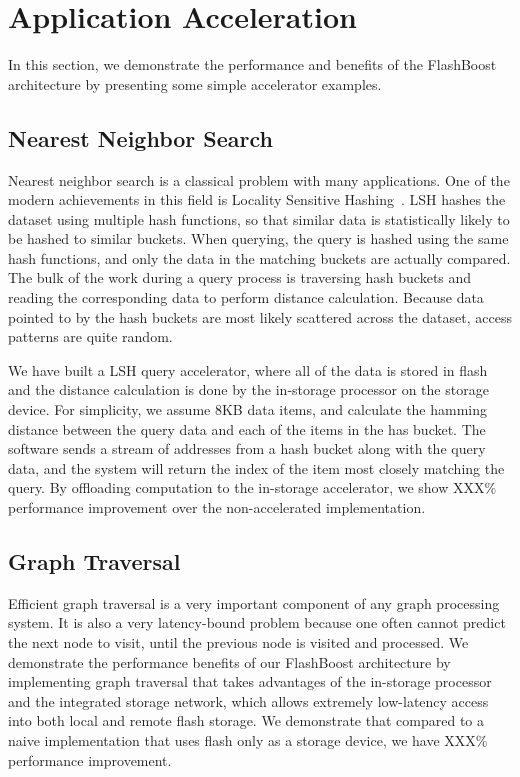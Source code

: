 \section{Application Acceleration}
\label{sec:acceleration}

In this section, we demonstrate the performance and benefits of the FlashBoost
architecture by presenting some simple accelerator examples. 

\subsection{Nearest Neighbor Search}

Nearest neighbor search is a classical problem with many applications. One of
the modern achievements in this field is Locality Sensitive Hashing~\cite{lsh}.
LSH hashes the dataset using multiple hash functions, so that
similar data is statistically likely to be hashed to similar buckets. When
querying, the query is hashed using the same hash functions, and only the data
in the matching buckets are actually compared. The bulk of the work during a
query process is traversing hash buckets and reading the corresponding data to
perform distance calculation. Because data pointed to by the hash buckets are
most likely scattered across the dataset, access patterns are quite random.

We have built a LSH query accelerator, where all of the data is stored in flash
and the distance calculation is done by the in-storage processor on the storage
device. For simplicity, we assume 8KB data items, and calculate the hamming
distance between the query data and each of the items in the has bucket. The
software sends a stream of addresses from a hash bucket along with the query
data, and the system will return the index of the item most closely matching the
query. By offloading computation to the in-storage accelerator, we
show XXX\% performance improvement over the non-accelerated implementation.



\subsection{Graph Traversal}

Efficient graph traversal is a very important component of any graph processing
system. It is also a very latency-bound problem because one often cannot predict
the next node to visit, until the previous node is visited and processed. We
demonstrate the performance benefits of our FlashBoost architecture by
implementing graph traversal that takes advantages of the in-storage processor
and the integrated storage network, which allows extremely low-latency access
into both local and remote flash storage. We demonstrate that compared to a
naive implementation that uses flash only as a storage device, we have XXX\%
performance improvement.


